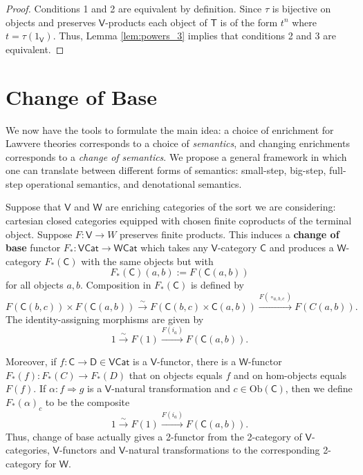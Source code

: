 \documentclass{amsart}
\theoremstyle{definition}
\newcommand{\Cat}{\mathsf{Cat}}
\newcommand{\V}{\mathsf{V}}
\newcommand{\W}{\mathsf{W}}
\newcommand{\D}{\mathsf{D}}
\newcommand{\C}{\mathsf{C}}
\newcommand{\T}{\mathsf{T}}
\newcommand{\Obj}{\mathrm{Ob}}
\newcommand{\maps}{\colon}
\begin{document}
\begin{proof}
Conditions 1 and 2 are equivalent by definition.   Since $\tau$ is bijective on 
objects and preserves $\V$-products each object of $\T$ is of the form $t^n$ 
where $t = \tau(1_\V)$.   Thus, Lemma \ref{lem:powers_3} implies that
conditions 2 and 3 are equivalent.
\end{proof}

\section{Change of Base}
\label{sec:base_change}

We now have the tools to formulate the main idea: a choice of enrichment for Lawvere theories corresponds to a choice of \textit{semantics}, and changing enrichments corresponds to a \textit{change of semantics}. We propose a general framework in which one can translate between different forms of semantics: small-step, big-step, full-step operational semantics, and denotational semantics.

Suppose that $\V$ and $\W$ are enriching categories of the sort we are considering: 
cartesian closed categories equipped with chosen finite coproducts of the terminal object.
Suppose $F \maps \V \to W$ preserves finite products.   This induces a \textbf{change of base} functor $F_*\maps\V\Cat \to \W\Cat$ \cite{borceux} which takes any $\V$-category $\C$ and produces a $\W$-category $F_*(\C)$ with the same objects but with
\[      F_*(\C)(a,b) := F(\C(a,b)) \]
for all objects $a,b$.   Composition in $F_*(\C)$ is defined by
\[       F(\C(b,c)) \times F(\C(a,b)) \stackrel{\sim}{\longrightarrow} F(\C(b,c) \times \C(a,b)) 
\xrightarrow{F(\circ_{a,b,c})} F(C(a,b)) . \]  
The identity-assigning morphisms are given by
\[          1 \stackrel{\sim}{\longrightarrow} F(1) \xrightarrow{F(i_a)}
F(\C(a,b)) .\]

Moreover, if $f\maps \C \to \D \in \V\Cat$ is a $\V$-functor, there is a $\W$-functor $F_*(f) \maps F_*(C) \to F_*(D)$ that on objects equals $f$ and on hom-objects equals $F(f)$. If $\alpha\maps f \Rightarrow g$ is a $\V$-natural transformation and $c\in \Obj(\C)$, then we define $F_*(\alpha)_c$ to be the composite
\[      1 \stackrel{\sim}{\longrightarrow} F(1) \xrightarrow{F(i_a)} F(\C(a,b)) .\]   
Thus, change of base actually gives a 2-functor from the 2-category of $\V$-categories, 
$\V$-functors and $\V$-natural transformations to the corresponding 2-category for $\W$.
\end{document}
